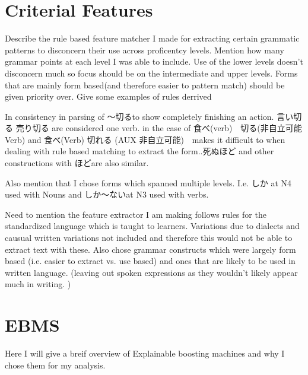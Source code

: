 \section{Criterial Features}
Describe the rule based feature matcher I made for extracting certain grammatic patterns to disconcern their use
across proficentcy levels. Mention how many grammar points at each level I was able to include. Use of the lower
levels doesn't disconcern much so focus should be on the intermediate and upper levels.  Forms that are mainly form
based(and therefore easier to pattern match) should be given priority over. Give some examples of rules derrived

In consistency in parsing of 〜切るto show completely finishing an action. 言い切る 売り切る are considered one verb. in the
case of 食べ(verb)　切る(非自立可能Verb) and 食べ(Verb) 切れる (AUX 非自立可能)　makes it difficult to when dealing with rule based
matching to extract the form..死ぬほど and other constructions with ほどare also similar.

Also mention that I chose forms which spanned multiple levels. I.e. しか at N4 used with Nouns and しか〜ないat N3 used
with verbs.

Need to mention the feature extractor I am making follows rules for the standardized language which is taught to
learners. Variations due to dialects and causual written variations not included and therefore this would not be
able to extract text with these. Also chose grammar constructs which were largely form based (i.e. easier to extract
vs. use based) and ones that are likely to be used in written language. (leaving out spoken expressions as they
wouldn't likely appear much in writing. )

\section{EBMS}
 Here I will give a breif overview of Explainable boosting machines and why I chose them for my analysis.





